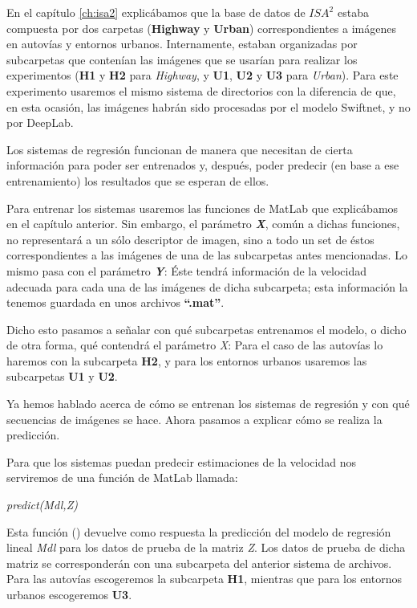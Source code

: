 En el capítulo \ref{ch:isa2} explicábamos que la base de datos de $ISA^{2}$ estaba compuesta por dos carpetas (\textbf{Highway} y \textbf{Urban}) correspondientes a imágenes en autovías y entornos urbanos. Internamente, estaban organizadas por subcarpetas que contenían las imágenes que se usarían para realizar los experimentos (\textbf{H1} y \textbf{H2} para \textit{Highway}, y \textbf{U1}, \textbf{U2} y \textbf{U3} para \textit{Urban}). Para este experimento usaremos el mismo sistema de directorios con la diferencia de que, en esta ocasión, las imágenes habrán sido procesadas por el modelo Swiftnet, y no por DeepLab.

Los sistemas de regresión funcionan de manera que necesitan de cierta información para poder ser entrenados y, después, poder predecir (en base a ese entrenamiento) los resultados que se esperan de ellos.

Para entrenar los sistemas usaremos las funciones de MatLab que explicábamos en el capítulo anterior. Sin embargo, el parámetro \textbf{\textit{X}}, común a dichas funciones, no representará a un sólo descriptor de imagen, sino a todo un set de éstos correspondientes a las imágenes de una de las subcarpetas antes mencionadas. Lo mismo pasa con el parámetro \textbf{\textit{Y}}: Éste tendrá información de la velocidad adecuada para cada una de las imágenes de dicha subcarpeta; esta información la tenemos guardada en unos archivos \textbf{``.mat''}.

Dicho esto pasamos a señalar con qué subcarpetas entrenamos el modelo, o dicho de otra forma, qué contendrá el parámetro \textit{X}: Para el caso de las autovías lo haremos con la subcarpeta \textbf{H2}, y para los entornos urbanos usaremos las subcarpetas \textbf{U1} y \textbf{U2}.

Ya hemos hablado acerca de cómo se entrenan los sistemas de regresión y con qué secuencias de imágenes se hace. Ahora pasamos a explicar cómo se realiza la predicción.

Para que los sistemas puedan predecir estimaciones de la velocidad nos serviremos de una función de MatLab llamada:

\begin{center}
\textit{predict(Mdl,Z)}
\end{center}

Esta función (\cite{predict}) devuelve como respuesta la predicción del modelo de regresión lineal \textit{Mdl} para los datos de prueba de la matriz \textit{Z}. Los datos de prueba de dicha matriz se corresponderán con una subcarpeta del anterior sistema de archivos. Para las autovías escogeremos la subcarpeta \textbf{H1}, mientras que para los entornos urbanos escogeremos \textbf{U3}.

